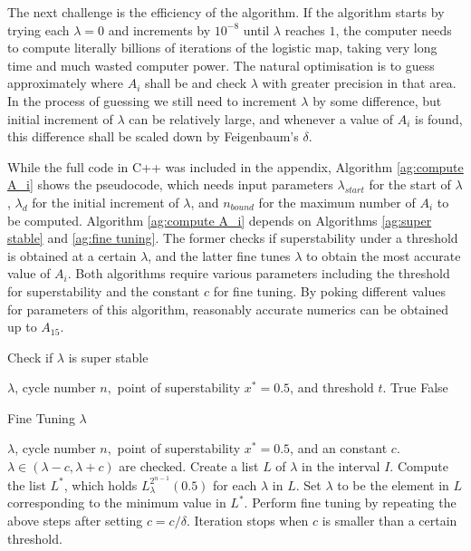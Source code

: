 The next challenge is the efficiency of the algorithm. 
If the algorithm starts by trying each $\lambda = 0$ and increments by $10^{-8}$ until $\lambda$ reaches $1$, the computer needs to compute literally billions of iterations of the logistic map, taking very long time and much wasted computer power.
The natural optimisation is to guess approximately where $A_i$ shall be and check $\lambda$ with greater precision in that area. 
In the process of guessing we still need to increment $\lambda$ by some difference, but initial increment of $\lambda$ can be relatively large, and whenever a value of $A_i$ is found, this difference shall be scaled down by Feigenbaum's  $\delta$.


While the full code in C++ was included in the appendix,
Algorithm \ref{ag:compute A_i} shows the pseudocode, which needs input parameters $\lambda_{start}$ for the start of $\lambda$, $\lambda_d$ for the initial increment of $\lambda$, and $n_{bound}$ for the maximum number of $A_i$ to be computed.
Algorithm \ref{ag:compute A_i} depends on Algorithms \ref{ag:super stable} and \ref{ag:fine tuning}. 
The former checks if superstability under a threshold is obtained at a certain $\lambda$, and the latter fine tunes $\lambda$ to obtain the most accurate value of $A_i$.
Both algorithms require various parameters including the threshold for superstability and the constant $c$ for fine tuning.
By poking different values for parameters of this algorithm, reasonably accurate numerics can be obtained up to $A_{15}$.


\begin{algorithm}
	\caption{Check if $\lambda$ is super stable}
	\begin{algorithmic}[1]
		\Require $\lambda$, cycle number $n,$ point of superstability $x^* = 0.5$, and threshold $t$.
		\State \Return True
		\Else
		\State \Return False
		\EndIf
	\end{algorithmic}
	\label{ag:super stable}
\end{algorithm}

\begin{algorithm}
	\caption{Fine Tuning $\lambda$}
	\begin{algorithmic}[1]
		\Require $\lambda$, cycle number $n,$ point of superstability $x^* = 0.5$, and an constant $c$. $\lambda \in (\lambda - c, \lambda +c)$ are checked.
		\State Create a list $L$ of $\lambda$ in the interval $I$.
		\State Compute the list $L^*$, which holds $L_{\lambda}^{2^{n-1}}(0.5)$ for each $\lambda$ in $L$.
		\State Set $\lambda$ to be the element in $L$ corresponding to the minimum value in $L^*$.
		\State Perform fine tuning by repeating the above steps after setting $c = c / \delta$. 
		\State Iteration stops when $c$ is smaller than a certain threshold.
	\end{algorithmic}
	\label{ag:fine tuning}
\end{algorithm}

